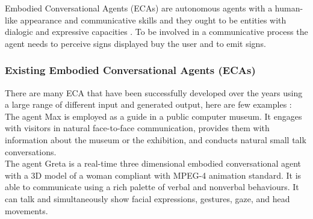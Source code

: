 \documentclass[11pt]{article}
\begin{document}
Embodied Conversational Agents (ECAs) are autonomous agents with a human-like appearance and communicative skills and they ought to be entities with dialogic and expressive capacities \citep{Pelachaud05}. To be involved in a communicative process the agent needs to perceive signs displayed buy the user and to emit signs.

\subsubsection{Existing Embodied Conversational Agents (ECAs)}
There are many ECA that have been successfully developed over the years using a large range of different input and generated output, here are few examples :\\

The agent Max \citep{Kopp05} is employed as a guide in a public computer museum. It engages with visitors in natural face-to-face communication, provides them with information about the museum or the exhibition, and conducts natural small talk conversations.\\

The agent Greta \citep{DeRosis03} is a real-time three dimensional embodied conversational agent with a 3D model of a woman compliant with MPEG-4 animation standard. It is able to communicate using a rich palette of verbal and nonverbal behaviours. It can talk and simultaneously show facial expressions, gestures, gaze, and head movements.\\
\end{document}
